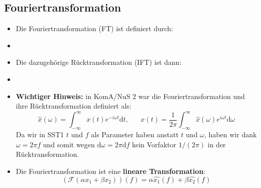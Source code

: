 \documentclass[11pt]{article}
\begin{document}
\vspace*{-0.5cm}
\subsection*{Fouriertransformation}
\vspace*{-0.5cm}
\begin{itemize}[leftmargin=0pt]
    \item[] Die Fouriertransformation (FT) ist definiert durch:
    \item[] %
    \item[] Die dazugehörige Rücktransformation (IFT) ist dann:
    \item[] %
\item[] \textbf{Wichtiger Hinweis:} in KomA/NuS 2 war die Fouriertransformation und ihre Rücktransformation definiert als:
$$\hat{x}(\omega) = \int_{-\infty}^{\infty} x(t) e^{-i\omega t}\text{d}t, \hspace{20pt} x(t)=\frac{1}{2\pi} \int_{-\infty}^{\infty} \hat{x}(\omega)e^{i\omega t} \text{d}\omega$$
Da wir in SST1 $t$ und $f$ als Parameter haben anstatt $t$ und $\omega$, haben wir dank $\omega = 2\pi f $ und somit wegen $\text{d}\omega = 2\pi \text{d}f$ kein Vorfaktor $1/(2\pi)$ in der Rücktransformation.
\item[] Die Fouriertransformation ist eine \textbf{lineare Transformation}:
$$(\mathcal{F}(\alpha x_1 + \beta x_2))(f) = \alpha \hat{x_1}(f) + \beta \hat{x_2}(f) $$
\end{itemize}

\pagebreak
\end{document}
